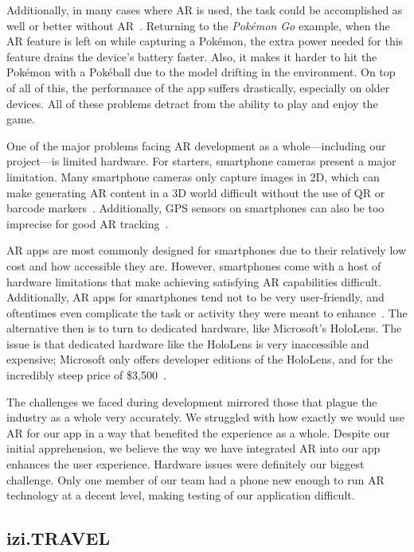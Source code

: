\documentclass[a4paper, 10pt, american, titlepage]{article}
\begin{document}
Additionally, in many cases where AR is used, the task could be accomplished as
well or better without AR~\autocite{theappsolutions2018}. Returning to the
\textit{Pokémon Go} example, when the AR feature is left on while capturing a
Pokémon, the extra power needed for this feature drains the device's battery
faster. Also, it makes it harder to hit the Pokémon with a Pokéball due to the
model drifting in the environment. On top of all of this, the performance of
the app suffers drastically, especially on older devices. All of these problems
detract from the ability to play and enjoy the game.

One of the major problems facing AR development as a whole---including our
project---is limited hardware. For starters, smartphone cameras present a
major limitation. Many smartphone cameras only capture images in 2D, which can
make generating AR content in a 3D world difficult without the use of QR or
barcode markers~\autocite{geospatialworld2018}. Additionally, GPS sensors on
smartphones can also be too imprecise for good AR
tracking~\autocite{geospatialworld2018}.

AR apps are most commonly designed for smartphones due to their relatively low
cost and how accessible they are. However, smartphones come with a host of
hardware limitations that make achieving satisfying AR capabilities difficult.
Additionally, AR apps for smartphones tend not to be very user-friendly, and
oftentimes even complicate the task or activity they were meant to
enhance~\autocite{theappsolutions2018}.  The alternative then is to turn to
dedicated hardware, like Microsoft's HoloLens. The issue is that dedicated
hardware like the HoloLens is very inaccessible and expensive; Microsoft only
offers developer editions of the HoloLens, and for the incredibly steep price
of \$3,500~\autocite{microsoft2019}.

The challenges we faced during development mirrored those that plague the
industry as a whole very accurately. We struggled with how exactly we would use
AR for our app in a way that benefited the experience as a whole. Despite our
initial apprehension, we believe the way we have integrated AR into our app
enhances the user experience. Hardware issues were definitely our biggest
challenge. Only one member of our team had a phone new enough to run AR
technology at a decent level, making testing of our application difficult.

\subsection{izi.TRAVEL}
\label{sec:iziTravel}
\end{document}
